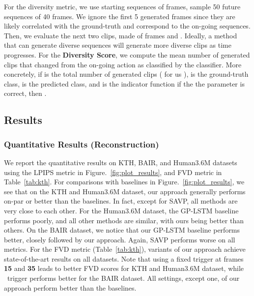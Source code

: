 \documentclass{article} \usepackage{iclr2021_conference,times}
\newcommand{\GP}{}
\begin{document}
For the diversity metric, we use  starting sequences of  frames, sample 50 future sequences of 40 frames. We ignore the first 5 generated frames since they are likely correlated with the ground-truth and correspond to the on-going sequences. Then, we evaluate the next two clips, made of frames  and . Ideally, a method that can generate diverse sequences will generate more diverse clips as time progresses. For the \textbf{Diversity Score}, we compute the mean number of generated clips that changed from the on-going action as classified by the classifier. More concretely, if  is the total number of generated clips ( for us 
),  is the ground-truth class,  is the predicted class, and  is the indicator function if the the parameter is correct, then .


\subsection{Results}
\label{sec:results}
\vspace{-0.05in}
\subsubsection{Quantitative Results (Reconstruction)} 
\vspace{-0.05in}
We report the quantitative results on KTH, BAIR, and Human3.6M datasets using the LPIPS metric in Figure.~\ref{fig:plot_results}, and FVD metric in Table~\ref{tab:kth}. For comparisons with baselines in Figure.~\ref{fig:plot_results}, we see that on the KTH and Human3.6M dataset, our approach generally performs on-par or better than the baselines. In fact, except for SAVP, all methods are very close to each other. For the Human3.6M dataset, the GP-LSTM baseline performs poorly, and all other methods are similar, with ours being better than others. On the BAIR dataset, we notice that our GP-LSTM baseline performs better, closely followed by our approach. Again, SAVP performs worse on all metrics. For the FVD metric (Table~\ref{tab:kth}), variants of our approach achieve state-of-the-art results on all datasets. Note that using a fixed trigger at frames \textbf{15} and \textbf{35} leads to better FVD scores for KTH and Human3.6M dataset, while \GP\ trigger performs better for the BAIR dataset. All settings, except one, of our approach perform better than the baselines.



\vspace{-0.05in}
\end{document}
